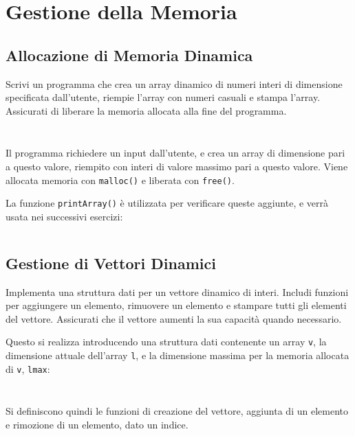 \documentclass{article}
\numberwithin{equation}{subsection}
\begin{document}
\clearpage

\section{Gestione della Memoria}

\subsection{Allocazione di Memoria Dinamica}

Scrivi un programma che crea un array dinamico di numeri interi di dimensione specificata dall'utente, riempie l'array con numeri casuali e stampa l'array. Assicurati di liberare la memoria allocata alla fine del programma. 

\inputminted[firstline=1, lastline=4]{c}{./"Esercitazione del 19-11-24"/domanda1.c}
\inputminted[firstline=20, lastline=32]{c}{./"Esercitazione del 19-11-24"/domanda1.c}

Il programma richiedere un input dall'utente, e crea un array di dimensione 
pari a questo valore, riempito con interi di valore massimo pari a questo valore. Viene allocata memoria con \verb|malloc()| e liberata con \verb|free()|. 

La funzione \verb|printArray()| è utilizzata per verificare queste aggiunte, e verrà 
usata nei successivi esercizi:
\inputminted[firstline=12, lastline=18]{c}{./"Esercitazione del 19-11-24"/domanda1.c}

\subsection{Gestione di Vettori Dinamici}

Implementa una struttura dati per un vettore dinamico di interi. Includi funzioni per aggiungere un elemento, rimuovere un elemento e stampare tutti gli elementi del vettore. Assicurati che il vettore aumenti la sua capacità quando necessario. 

Questo si realizza introducendo una struttura dati contenente un array \verb|v|, la dimensione 
attuale dell'array \verb|l|, e la dimensione massima per la memoria allocata di \verb|v|, \verb|lmax|:

\inputminted[firstline=1, lastline=5]{c}{./"Esercitazione del 19-11-24"/domanda2.c}
\inputminted[firstline=13, lastline=17]{c}{./"Esercitazione del 19-11-24"/domanda2.c}

Si definiscono quindi le funzioni di creazione del vettore, aggiunta di un 
elemento e rimozione di un elemento, dato un indice. 
\end{document}
